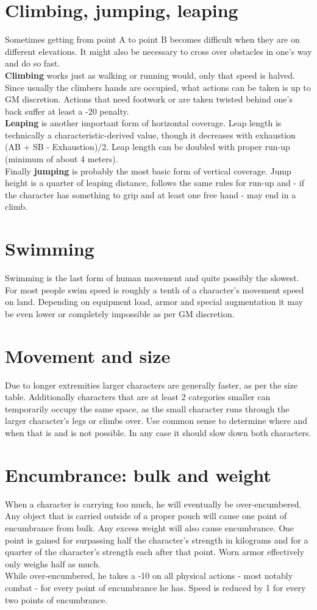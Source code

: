 \documentclass[12pt,a4paper,openany]{book}
\begin{document}
	\section{Climbing, jumping, leaping}
	Sometimes getting from point A to point B becomes difficult when they are on different elevations. It might also be necessary to cross over obstacles in one’s way and do so fast.\\
	\textbf{Climbing} works just as walking or running would, only that speed is halved. Since usually the climbers hands are occupied, what actions can be taken is up to GM discretion. Actions that need footwork or are taken twisted behind one’s back suffer at least a -20 penalty.\\
	\textbf{Leaping} is another important form of horizontal coverage. Leap length is technically a characteristic-derived value, though it decreases with exhaustion (AB + SB - Exhaustion)/2. Leap length can be doubled with proper run-up (minimum of about 4 meters).\\
	Finally \textbf{jumping} is probably the most basic form of vertical coverage. Jump height is a quarter of leaping distance, follows the same rules for run-up and - if the character has something to grip and at least one free hand - may end in a climb.
	\section{Swimming}
	Swimming is the last form of human movement and quite possibly the slowest. For most people swim speed is roughly a tenth of a character’s movement speed on land. Depending on equipment load, armor and special augmentation it may be even lower or completely impossible as per GM discretion.
	\section{Movement and size}
	Due to longer extremities larger characters are generally faster, as per the size table. Additionally characters that are at least 2 categories smaller can temporarily occupy the same space, as the small character runs through the larger character’s legs or climbs over. Use common sense to determine where and when that is and is not possible. In any case it should slow down both characters.
	\section{Encumbrance: bulk and weight}
	When a character is carrying too much, he will eventually be over-encumbered. Any object that is carried outside of a proper pouch will cause one point of encumbrance from bulk.
	Any excess weight will also cause encumbrance. One point is gained for surpassing half the character’s strength in kilograms and for a quarter of the character’s strength each after that point. Worn armor effectively only weighs half as much.\\
	While over-encumbered, he takes a -10 on all physical actions - most notably combat - for every point of encumbrance he has. Speed is reduced by 1 for every two points of encumbrance.
	
\end{document}
